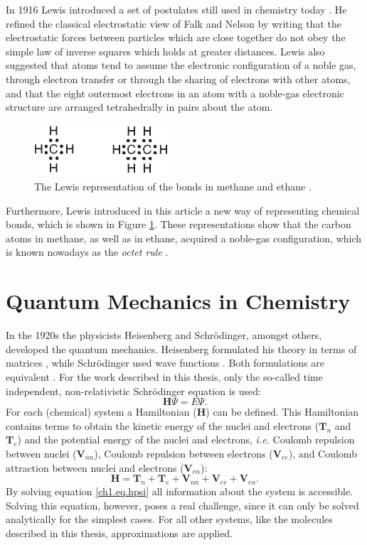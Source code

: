 In 1916 Lewis introduced a set of postulates still used in chemistry today \cite{lewis}. He refined the classical electrostatic view of Falk and Nelson by writing that the electrostatic forces between particles which are close together do not obey the simple law of inverse squares which holds at greater distances. Lewis also suggested that atoms tend to assume the electronic configuration of a noble gas, through electron transfer or through the sharing of electrons with other atoms, and that the eight outermost electrons in an atom with a noble-gas electronic structure are arranged tetrahedrally in pairs about the atom.
\begin{figure}[htp]
\center
\includegraphics[width=2in]{introduction/figures/figure2.eps}
\caption{The Lewis representation of the bonds in methane and ethane \cite{lewis}.}
\label{ch1.fig2}
\end{figure}
Furthermore, Lewis introduced in this article a new way of representing chemical bonds, which is shown in Figure \ref{ch1.fig2}. These representations show that the carbon atoms in methane, as well as in ethane, acquired a noble-gas configuration, which is known nowadays as the \textit{octet rule} \cite{bruice}.

\section{Quantum Mechanics in Chemistry}

In the 1920s the physicists Heisenberg and Schr\"{o}dinger, amongst others, developed the quantum mechanics. Heisenberg formulated his theory in terms of matrices \cite{heisenberg}, while Schr\"{o}dinger used wave functions \cite{schrodinger1,schrodinger2}. Both formulations are equivalent \cite{schrodinger3}. For the work described in this thesis, only the so-called time independent, non-relativistic Schr\"{o}dinger equation is used:
\begin{equation}
\mathbf{H} \Psi=E \Psi.
\label{ch1.eq.hpsi}
\end{equation}
For each (chemical) system a Hamiltonian ($\mathbf{H}$) can be defined. This Hamiltonian contains terms to obtain the kinetic energy of the nuclei and electrons ($\mathbf{T}_n$ and $\mathbf{T}_e$) and the potential energy of the nuclei and electrons, \textit{i.e.} Coulomb repulsion between nuclei ($\mathbf{V}_{nn}$), Coulomb repulsion between electrons ($\mathbf{V}_{ee}$), and Coulomb attraction between nuclei and electrons ($\mathbf{V}_{en}$):
\begin{equation}
\mathbf{H} = \mathbf{T}_n + \mathbf{T}_e + \mathbf{V}_{nn} + \mathbf{V}_{ee} + \mathbf{V}_{en}.
\label{ch1.eq.htotal}
\end{equation}
By solving equation \ref{ch1.eq.hpsi} all information about the system is accessible. Solving this equation, however, poses a real challenge, since it can only be solved analytically for the simplest cases. For all other systems, like the molecules described in this thesis, approximations are applied.

